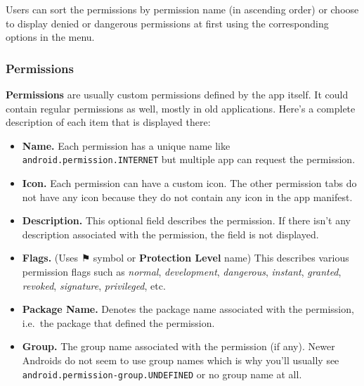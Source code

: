 Users can sort the permissions by permission name (in ascending order) or choose to display denied or dangerous
permissions at first using the corresponding options in the menu.

\subsubsection{Permissions}\label{subsubsec:permissions}
\textbf{Permissions} are usually custom permissions defined by the app itself. It could contain regular permissions as
well, mostly in old applications. Here's a complete description of each item that is displayed there:
\begin{itemize}
    \item \textbf{Name.} Each permission has a unique name like \texttt{android.permission.INTERNET} but multiple app
    can request the permission.

    \item \textbf{Icon.} Each permission can have a custom icon. The other permission tabs do not have any icon because
    they do not contain any icon in the app manifest.

    \item \textbf{Description.} This optional field describes the permission. If there isn't any description associated
    with the permission, the field is not displayed.

    \item \textbf{Flags.} (Uses ⚑ symbol or \textbf{Protection Level} name) This describes various permission flags such
    as \textit{normal}, \textit{development}, \textit{dangerous}, \textit{instant}, \textit{granted}, \textit{revoked},
    \textit{signature}, \textit{privileged}, etc.

    \item \textbf{Package Name.} Denotes the package name associated with the permission, i.e.\ the package that defined
    the permission.

    \item \textbf{Group.} The group name associated with the permission (if any). Newer Androids do not seem to use
    group names which is why you'll usually see \texttt{android.permission-group.UNDEFINED} or no group name at all.
\end{itemize}

